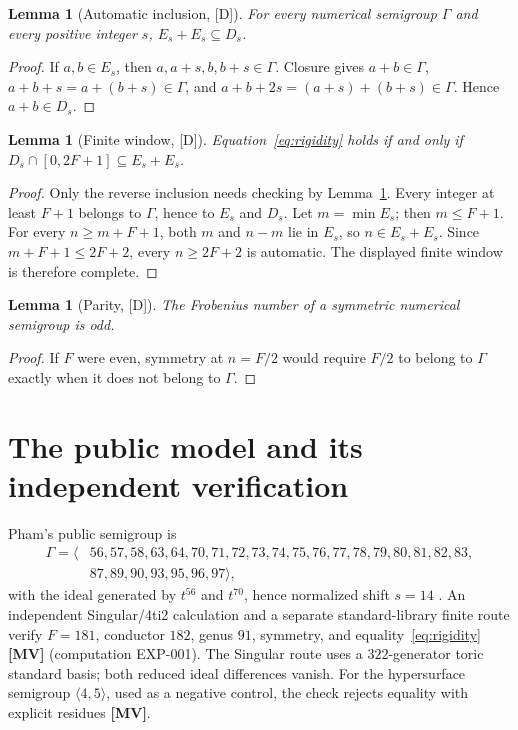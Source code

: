 \documentclass[11pt]{article}
\newtheorem{lemma}[theorem]{Lemma}
\theoremstyle{definition}
\theoremstyle{remark}
\begin{document}
\begin{lemma}[Automatic inclusion, {[D]}]\label{lem:auto}
For every numerical semigroup $\Gamma$ and every positive integer $s$,
$E_s+E_s\subseteq D_s$.
\end{lemma}
\begin{proof}
If $a,b\in E_s$, then $a,a+s,b,b+s\in\Gamma$. Closure gives
$a+b\in\Gamma$, $a+b+s=a+(b+s)\in\Gamma$, and
$a+b+2s=(a+s)+(b+s)\in\Gamma$. Hence $a+b\in D_s$.
\end{proof}

\begin{lemma}[Finite window, {[D]}]\label{lem:window}
Equation~\eqref{eq:rigidity} holds if and only if
$D_s\cap[0,2F+1]\subseteq E_s+E_s$.
\end{lemma}
\begin{proof}
Only the reverse inclusion needs checking by Lemma~\ref{lem:auto}. Every integer at least $F+1$
belongs to $\Gamma$, hence to $E_s$ and $D_s$. Let $m=\min E_s$; then $m\le F+1$. For every
$n\ge m+F+1$, both $m$ and $n-m$ lie in $E_s$, so $n\in E_s+E_s$. Since
$m+F+1\le2F+2$, every $n\ge2F+2$ is automatic. The displayed finite window is therefore complete.
\end{proof}

\begin{lemma}[Parity, {[D]}]\label{lem:parity}
The Frobenius number of a symmetric numerical semigroup is odd.
\end{lemma}
\begin{proof}
If $F$ were even, symmetry at $n=F/2$ would require $F/2$ to belong to $\Gamma$ exactly when it
does not belong to $\Gamma$.
\end{proof}

\section{The public model and its independent verification}

Pham's public semigroup is
\begin{align*}
\Gamma=\langle&56,57,58,63,64,70,71,72,73,74,75,76,77,78,79,80,81,82,83,\\
&87,89,90,93,95,96,97\rangle,
\end{align*}
with the ideal generated by $t^{56}$ and $t^{70}$, hence normalized shift $s=14$
\cite{Pham2026}. An independent Singular/4ti2 calculation and a separate standard-library finite
route verify $F=181$, conductor $182$, genus $91$, symmetry, and equality~\eqref{eq:rigidity}
\textbf{[MV]} (computation EXP-001). The Singular route uses a $322$-generator toric standard
basis; both reduced ideal differences vanish. For the hypersurface semigroup $\langle4,5\rangle$,
used as a negative control, the check rejects equality with explicit residues \textbf{[MV]}.
\end{document}
